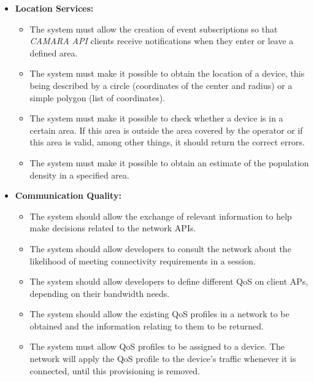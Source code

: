 \begin{itemize}
	\item \textbf{Location Services:}
	      \begin{itemize}

		      \item The system must allow the creation of event subscriptions so that
		            \emph{CAMARA API} clients receive notifications when they enter or leave a
		            defined area.

		      \item The system must make it possible to obtain the location of a
		            device, this being described by a circle (coordinates of the center and
		            radius) or a simple polygon (list of coordinates).

		      \item The system must make it possible to check whether a device is in a
		            certain area. If this area is outside the area covered by the operator
		            or if this area is valid, among other things, it should return the
		            correct errors.

		      \item The system must make it possible to obtain an estimate of the
		            population density in a specified area.
	      \end{itemize}

	\item \textbf{Communication Quality:}
	      \begin{itemize}
		      \item The system should allow the exchange of relevant information to help make
		            decisions related to the network APIs.

		      \item The system should allow developers to consult the network about the
		            likelihood of meeting connectivity requirements in a session.

		      \item The system should allow developers to define different QoS on client APs,
		            depending on their bandwidth needs.

		      \item The system should allow the existing QoS profiles in a network to be
		            obtained and the information relating to them to be returned.

		      \item The system must allow QoS profiles to be assigned to a device. The
		            network will apply the QoS profile to the device's traffic whenever it is
		            connected, until this provisioning is removed.
	      \end{itemize}


\end{itemize}
